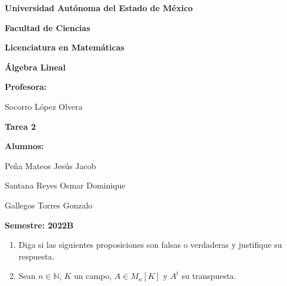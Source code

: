 \documentclass[fleqn]{article}
\begin{document}
    \begin{titlepage}
        \centering
        {\Huge \textbf{Universidad Autónoma del Estado de México}\par}
        \vspace{0.9cm}

        {\Huge \textbf{Facultad de Ciencias}\par}
        \vspace{0.9cm}

        {\Huge \textbf{Licenciatura en Matemáticas}\par}
        \vspace{1.8cm}

        {\huge \textbf{Álgebra Lineal}\par}
        \vspace{0.7cm}

        {\huge \textbf{Profesora:}\par}
        \vspace{0.3cm}
        {\huge Socorro López Olvera}\par
        \vspace{0.7cm}

        {\huge \textbf{Tarea 2}\par}
        \vspace{0.7cm}

        {\huge \textbf{Alumnos:}\par}
        \vspace{0.3cm}
        {\huge Peña Mateos Jesús Jacob}\par
        {\huge Santana Reyes Osmar Dominique}\par
        {\huge Gallegos Torres Gonzalo}\par
        \vspace{1.8cm}

        {\huge \textbf{Semestre: 2022B}\par}
        \vspace{0.7cm}
        \vfill
        \par
    \end{titlepage}

    \begin{enumerate}
        \item Diga si las siguientes proposiciones son falsas o verdaderas y justifique su respuesta.
        \item Sean $ n \in \mathbb{N} $, $ K $ un campo, $ A \in M_n[K] $ y $ A^t $ su transpuesta.
    \end{enumerate}
\end{document}
